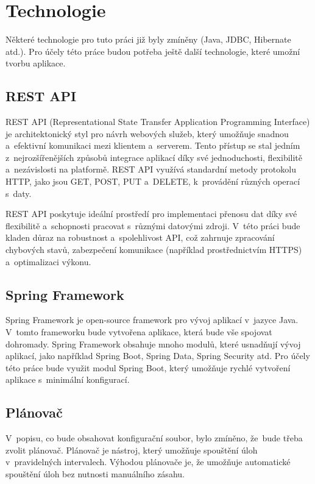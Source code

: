 \chapter{Technologie}

Některé technologie pro tuto práci již byly zmíněny (Java, JDBC, Hibernate atd.).  
Pro účely této práce budou potřeba ještě další technologie, které umožní tvorbu aplikace.

\section{REST API}

REST API (Representational State Transfer Application Programming Interface) je architektonický  
styl pro návrh webových služeb, který umožňuje snadnou a~efektivní komunikaci mezi klientem a~serverem.  
Tento přístup se stal jedním z~nejrozšířenějších způsobů integrace aplikací díky své jednoduchosti,  
flexibilitě a~nezávislosti na platformě. REST API využívá standardní metody protokolu HTTP, jako jsou  
GET, POST, PUT a~DELETE, k~provádění různých operací s~daty.

REST API poskytuje ideální prostředí pro implementaci přenosu dat díky své flexibilitě a~schopnosti  
pracovat s~různými datovými zdroji. V~této práci bude kladen důraz na robustnost a~spolehlivost API,  
což zahrnuje zpracování chybových stavů, zabezpečení komunikace (například prostřednictvím HTTPS)  
a~optimalizaci výkonu.  
\cite{rest_api}

\section{Spring Framework}

Spring Framework je open-source framework pro vývoj aplikací v~jazyce Java.  
V~tomto frameworku bude vytvořena aplikace, která bude vše spojovat dohromady.  
Spring Framework obsahuje mnoho modulů, které usnadňují vývoj aplikací,  
jako například Spring Boot, Spring Data, Spring Security atd.  
Pro účely této práce bude využit modul Spring Boot, který umožňuje rychlé  
vytvoření aplikace s~minimální konfigurací.  
\cite{spring_framework}

\newpage
\section{Plánovač}

V~popisu, co bude obsahovat konfigurační soubor, bylo zmíněno, že~bude třeba zvolit plánovač.  
Plánovač je nástroj, který umožňuje spouštění úloh v~pravidelných intervalech.  
Výhodou plánovače je, že umožňuje automatické spouštění úloh bez nutnosti manuálního zásahu.  

